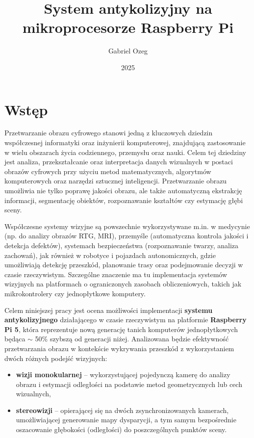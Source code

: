 \documentclass[magisterska]{pracadypl}
\author{Gabriel Ozeg}
\title{System antykolizyjny na mikroprocesorze Raspberry Pi}
\date{2025}
\begin{document}
\maketitle
\tableofcontents
\newpage

\chapter{Wstęp}

Przetwarzanie obrazu cyfrowego stanowi jedną z kluczowych dziedzin współczesnej informatyki oraz inżynierii komputerowej, znajdującą zastosowanie w wielu obszarach życia codziennego, przemysłu oraz nauki. Celem tej dziedziny jest analiza, przekształcanie oraz interpretacja danych wizualnych w postaci obrazów cyfrowych przy użyciu metod matematycznych, algorytmów komputerowych oraz narzędzi sztucznej inteligencji. Przetwarzanie obrazu umożliwia nie tylko poprawę jakości obrazu, ale także automatyczną ekstrakcję informacji, segmentację obiektów, rozpoznawanie kształtów czy estymację głębi sceny.

Współczesne systemy wizyjne są powszechnie wykorzystywane m.in. w medycynie (np. do analizy obrazów RTG, MRI), przemyśle (automatyczna kontrola jakości i detekcja defektów), systemach bezpieczeństwa (rozpoznawanie twarzy, analiza zachowań), jak również w robotyce i pojazdach autonomicznych, gdzie umożliwiają detekcję przeszkód, planowanie trasy oraz podejmowanie decyzji w czasie rzeczywistym. Szczególne znaczenie ma tu implementacja systemów wizyjnych na platformach o ograniczonych zasobach obliczeniowych, takich jak mikrokontrolery czy jednopłytkowe komputery.

Celem niniejszej pracy jest ocena możliwości implementacji \textbf{systemu antykolizyjnego} działającego w czasie rzeczywistym na platformie \textbf{Raspberry Pi 5}, która reprezentuje nową generację tanich komputerów jednopłytkowych będąca $\sim$ 50\% szybszą od generacji niżej. Analizowana będzie efektywność przetwarzania obrazu w kontekście wykrywania przeszkód z wykorzystaniem dwóch różnych podejść wizyjnych:

\begin{itemize}
  \item \textbf{wizji monokularnej} – wykorzystującej pojedynczą kamerę do analizy obrazu i estymacji odległości na podstawie metod geometrycznych lub cech wizualnych,
  \item \textbf{stereowizji} – opierającej się na dwóch zsynchronizowanych kamerach, umożliwiającej generowanie mapy dysparycji, a tym samym bezpośrednie oszacowanie głębokości (odległości) do poszczególnych punktów sceny.
\end{itemize}
\end{document}
